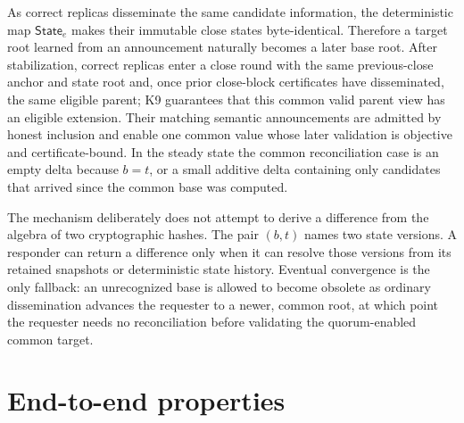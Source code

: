 \documentclass[11pt]{article}
\theoremstyle{definition}
\theoremstyle{remark}
\newcommand{\State}{\mathsf{State}}
\begin{document}
As correct replicas disseminate the same candidate information, the deterministic map $\State_e$ makes their immutable close states byte-identical. Therefore a target root learned from an announcement naturally becomes a later base root. After stabilization, correct replicas enter a close round with the same previous-close anchor and state root and, once prior close-block certificates have disseminated, the same eligible parent; K9 guarantees that this common valid parent view has an eligible extension. Their matching semantic announcements are admitted by honest inclusion and enable one common value whose later validation is objective and certificate-bound. In the steady state the common reconciliation case is an empty delta because $b=t$, or a small additive delta containing only candidates that arrived since the common base was computed.

The mechanism deliberately does not attempt to derive a difference from the algebra of two cryptographic hashes. The pair $(b,t)$ names two state versions. A responder can return a difference only when it can resolve those versions from its retained snapshots or deterministic state history. Eventual convergence is the only fallback: an unrecognized base is allowed to become obsolete as ordinary dissemination advances the requester to a newer, common root, at which point the requester needs no reconciliation before validating the quorum-enabled common target.

\section{End-to-end properties}
\end{document}
